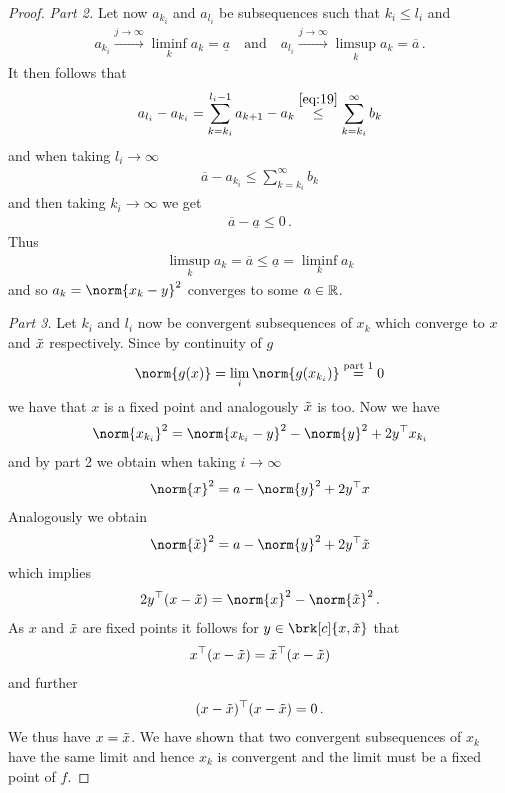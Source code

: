\begin{proof}
\textit{Part 2.}
Let now $a_{k_i}$ and $a_{l_i}$ be subsequences such that $k_i\leq l_i$ and
\begin{align*}
	a_{k_i}\xrightarrow{j\to\infty}\liminf_ka_k=\underline{a} \quad \text{and} \quad
	a_{l_i}\xrightarrow{j\to\infty}\limsup_ka_k=\overline{a}\,.	
\end{align*}
It then follows that
\begin{align*}
	a_{l_i}-a_{k_i}
	= \sum_{k=k_i}^{l_i-1}a_{k+1}-a_k
	\stackrel{\eqref{eq:19}}{\leq} \sum_{k=k_i}^\infty b_k
\end{align*}
and when taking $l_i\to\infty$
\begin{align*}
	\overline{a}-a_{k_i}\leq \sum_{k=k_i}^\infty b_k
\end{align*}
and then taking $k_i\to\infty$ we get
\begin{align*}
	\overline{a}-\underline{a}\leq 0\,.
\end{align*}
Thus
\begin{align*} 
	\limsup_ka_k=\overline{a}\leq \underline{a}=\liminf_ka_k
\end{align*}
and so $a_k=\norm{x_k-y}^2$ converges to some $a\in\mathbb{R}$.

\textit{Part 3.}
Let $k_i$ and $l_i$ now be convergent subsequences of $x_k$ which converge to $x$ and $\tilde{x}$ respectively. Since by continuity of $g$
\begin{align*}
	\norm{g(x)}=\lim_i\norm{g(x_{k_i})}\stackrel{\text{part 1}}{=}0
\end{align*}
we have that $x$ is a fixed point and analogously $\tilde{x}$ is too.
Now we have
\begin{align*}
	\norm{x_{k_i}}^2
	= \norm{x_{k_i}-y}^2-\norm{y}^2+2y^\top x_{k_i}
\end{align*}
and by part 2 we obtain when taking $i\to\infty$
\begin{align*}
	\norm{x}^2
	= a-\norm{y}^2+2y^\top x
\end{align*}
Analogously we obtain
\begin{align*}
	\norm{\tix}^2=a-\norm{y}^2+2y^\top \tix
\end{align*}
which implies
\begin{align*}
	2y^\top(x-\tix) = \norm{x}^2-\norm{\tix}^2\,.
\end{align*}
As $x$ and $\tilde{x}$ are fixed points it follows for $y\in\brk[c]{x,\tix}$ that
\begin{align*}
	x^\top(x-\tilde{x}) = \tilde{x}^\top(x- \tilde{x})
\end{align*}
and further
\begin{align*}
	(x-\tilde{x})^\top(x-\tilde{x}) = 0\,.
\end{align*}
We thus have $x=\tilde{x}$. We have shown that two convergent subsequences of $x_k$ have the same limit and hence $x_k$ is convergent and the limit must be a fixed point of $f$.

\end{proof}



